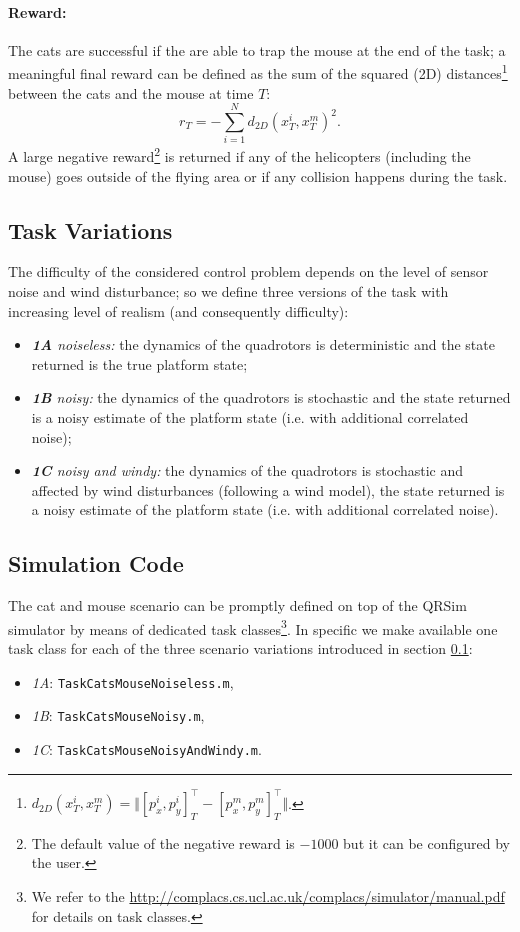 \documentclass[a4paper,11pt]{report}
\newcommand{\sname}{QRSim\xspace}
\newcommand{\webman}{\url{http://complacs.cs.ucl.ac.uk/complacs/simulator/manual.pdf}\xspace}
\newcommand\mytexttt[1]{\texttt{\hyphenchar\font=45\relax #1}}
\begin{document}
\paragraph{Reward:}
The cats are successful if the are able to trap the mouse at the end of the task; a meaningful final reward can be defined as the sum of the squared (2D) distances\footnote{$d_{2D}(x^i_T,x^m_T) = \Vert[p^i_x,p^i_y]_T^\intercal - [p^m_x,p^m_y]_T^\intercal\Vert$.} between the cats and the mouse at time $T$:
$$r_T = - \sum^N_{i=1} d_{2D}(x^i_T,x^m_T)^2.$$
A large negative reward\footnote{The default value of the negative reward is $-1000$ but it can be configured by the user.} is returned if any of the helicopters (including the mouse) goes outside of the flying area or if any collision happens during the task.

\subsection{Task Variations} \label{CatMouseVariations}
The difficulty of the considered control problem depends on the level of sensor noise and wind disturbance; so we define three versions of the task with increasing level of realism (and consequently difficulty):
\begin{itemize}
 \item \textit{\textbf{1A} noiseless:} the dynamics of the quadrotors is deterministic and the state returned is the true platform state;
 \item \textit{\textbf{1B} noisy:} the dynamics of the quadrotors is stochastic and the state returned is a noisy estimate of the platform state (i.e. with additional correlated noise);
 \item \textit{\textbf{1C} noisy and windy:} the dynamics of the quadrotors is stochastic and affected by wind disturbances (following a wind model), the state returned is a noisy estimate of the platform state (i.e. with additional correlated noise).
\end{itemize}

\subsection{Simulation Code}\label{CatMouseSim}
The cat and mouse scenario can be promptly defined on top of the \sname simulator by means of dedicated task classes\footnote{We refer to the \webman for details on task classes.}. In specific we make available one task class for each of the three scenario variations introduced in section \ref{CatMouseVariations}:
\begin{itemize}
\item\textit{1A}: \mytexttt{TaskCatsMouseNoiseless.m},
\item\textit{1B}: \mytexttt{TaskCatsMouseNoisy.m},
\item\textit{1C}: \mytexttt{TaskCatsMouseNoisyAndWindy.m}. 
\end{itemize}
\end{document}
